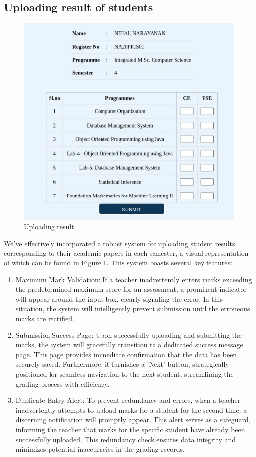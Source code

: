 \documentclass{nascproject}
\begin{document}
\subsection{Uploading result of students}
\begin{figure}
	\centering
	\includegraphics[width=1\linewidth]{upload1.jpeg}
	\caption{Uploading result}
	\label{upload}
\end{figure}
We've effectively incorporated a robust system for uploading student results corresponding to their academic papers in each semester, a visual representation of which can be found in Figure \ref{upload}. This system boasts several key features:
\begin{enumerate}
	\item Maximum Mark Validation: If a teacher inadvertently enters marks exceeding the predetermined maximum score for an assessment, a prominent indicator will appear around the input box, clearly signaling the error. In this situation, the system will intelligently prevent submission until the erroneous marks are rectified.
	\item Submission Success Page: Upon successfully uploading and submitting the marks, the system will gracefully transition to a dedicated success message page. This page provides immediate confirmation that the data has been securely saved. Furthermore, it furnishes a 'Next' button, strategically positioned for seamless navigation to the next student, streamlining the grading process with efficiency.
	\item Duplicate Entry Alert: To prevent redundancy and errors, when a teacher inadvertently attempts to upload marks for a student for the second time, a discerning notification will promptly appear. This alert serves as a safeguard, informing the teacher that marks for the specific student have already been successfully uploaded. This redundancy check ensures data integrity and minimizes potential inaccuracies in the grading records.\\

\end{enumerate}
\end{document}
